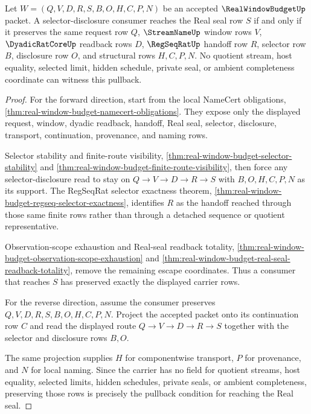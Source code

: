 \begin{theorem}
\label{thm:real-window-budget-selector-pullback-exactness}
Let $W=(Q,V,D,R,S,B,O,H,C,P,N)$ be an accepted $\RealWindowBudgetUp$ packet.
A selector-disclosure consumer reaches the Real seal row $S$ if and only if it
preserves the same request row $Q$, $\StreamNameUp$ window rows $V$,
$\DyadicRatCoreUp$ readback rows $D$, $\RegSeqRatUp$ handoff row $R$,
selector row $B$, disclosure row $O$, and structural rows $H,C,P,N$.
No quotient stream, host equality, selected limit, hidden schedule, private
seal, or ambient completeness coordinate can witness this pullback.
\end{theorem}
\begin{proof}
For the forward direction, start from the local NameCert obligations,
\autoref{thm:real-window-budget-namecert-obligations}. They expose only the
displayed request, window, dyadic readback, handoff, Real seal, selector,
disclosure, transport, continuation, provenance, and naming rows.

Selector stability and finite-route visibility,
\autoref{thm:real-window-budget-selector-stability} and
\autoref{thm:real-window-budget-finite-route-visibility}, then force any
selector-disclosure read to stay on $Q \to V \to D \to R \to S$ with
$B,O,H,C,P,N$ as its support. The RegSeqRat selector exactness theorem,
\autoref{thm:real-window-budget-regseq-selector-exactness}, identifies $R$ as
the handoff reached through those same finite rows rather than through a
detached sequence or quotient representative.

Observation-scope exhaustion and Real-seal readback totality,
\autoref{thm:real-window-budget-observation-scope-exhaustion} and
\autoref{thm:real-window-budget-real-seal-readback-totality}, remove the
remaining escape coordinates. Thus a consumer that reaches $S$ has preserved
exactly the displayed carrier rows.

For the reverse direction, assume the consumer preserves
$Q,V,D,R,S,B,O,H,C,P,N$. Project the accepted packet onto its continuation row
$C$ and read the displayed route $Q \to V \to D \to R \to S$ together with the
selector and disclosure rows $B,O$.

The same projection supplies $H$ for componentwise transport, $P$ for
provenance, and $N$ for local naming. Since the carrier has no field for
quotient streams, host equality, selected limits, hidden schedules, private
seals, or ambient completeness, preserving those rows is precisely the
pullback condition for reaching the Real seal.
\end{proof}

